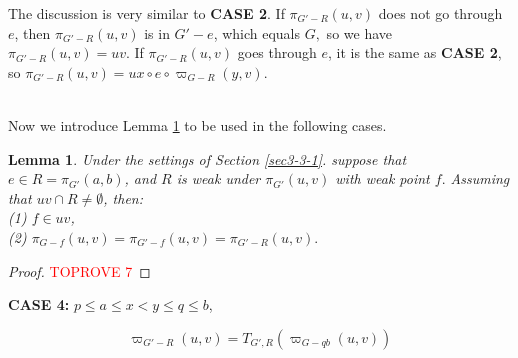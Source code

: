 \documentclass[11pt]{article}
\theoremstyle{plain}
\newtheorem{lemma}[theorem]{Lemma}
\theoremstyle{definition}
\newcommand{\new}[1]{\pi_{G'}(#1)}
\newcommand{\og}[3]{\pi_{G-#3}\left(#1,#2\right)}
\newcommand{\nng}[3]{\pi_{G'-#3}\left(#1,#2\right)}
\newcommand{\odg}[3]{\varpi_{G-#3}\left(#1,#2\right)}
\newcommand{\ndg}[3]{\varpi_{G'-#3}\left(#1,#2\right)}
\newcommand{\pp}[1]{T_{G',R}\left(#1\right)}
\begin{document}
The discussion is very similar to \textbf{CASE 2}. If $\nng{u}{v}{R}$ does not go through $e$, then $\nng{u}{v}{R}$ is in $G'-e$, which equals $G,$ so we have $\nng{u}{v}{R}=uv$. If $\nng{u}{v}{R}$ goes through $e$, it is the same as \textbf{CASE 2}, so $\nng{u}{v}{R}=ux\circ e\circ\odg{y}{v}{R}$.





~\\
Now we introduce Lemma \ref{thm4-1} to be used in the following cases.

\begin{lemma}\label{thm4-1}
    Under the settings of Section \ref{sec3-3-1}. suppose that $e\in R=\new{a,b}$, and $R$ is weak under $\new{u,v}$ with weak point $f.$ Assuming that $uv\cap R\neq\emptyset$, then:\\
    (1) $f\in uv$,\\
    (2) $\og{u}{v}{f}=\nng{u}{v}{f}=\nng{u}{v}{R}.$
\end{lemma}

\begin{proof}\textcolor{red}{TOPROVE 7}\end{proof}



\noindent\textbf{CASE 4:} $p\le a\le x<y\le q\le b$,

$$\ndg{u}{v}{R}=\pp{\odg{u}{v}{qb}} $$
\end{document}
